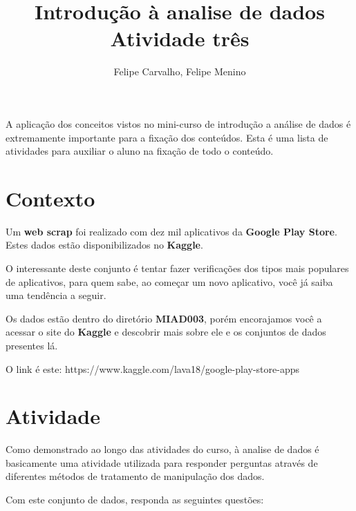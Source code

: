 \documentclass[12pt]{article}
\title{Introdução à analise de dados\\ Atividade três}
\author{Felipe Carvalho\inst{1}, Felipe Menino\inst{2}}
\begin{document}
 

\maketitle

     
\begin{resumo} 
    A aplicação dos conceitos vistos no mini-curso de introdução a análise de dados é extremamente importante para a fixação dos conteúdos. Esta é uma lista de atividades para auxiliar o aluno na fixação de todo o conteúdo.
\end{resumo}

\section{Contexto}

Um \textbf{web scrap} foi realizado com dez mil aplicativos da \textbf{Google Play Store}. Estes dados estão disponibilizados no \textbf{Kaggle}.

O interessante deste conjunto é tentar fazer verificações dos tipos mais populares de aplicativos, para quem sabe, ao começar um novo aplicativo, você já saiba uma tendência a seguir.

Os dados estão dentro do diretório \textbf{MIAD003}, porém encorajamos você a acessar o site do \textbf{Kaggle} e descobrir mais sobre ele e os conjuntos de dados presentes lá.

O link é este: https://www.kaggle.com/lava18/google-play-store-apps

\section{Atividade}

Como demonstrado ao longo das atividades do curso, à analise de dados é basicamente uma atividade utilizada para responder perguntas através de diferentes métodos de tratamento de manipulação dos dados.

Com este conjunto de dados, responda as seguintes questões:
\end{document}
